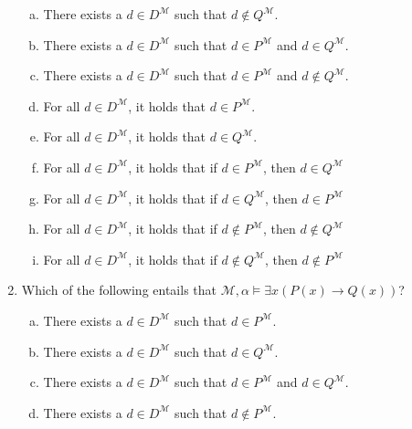 \begin{enumerate}[\thesection.1]
\begin{enumerate}[(a)]
  \item There exists a $d\in D^\mathcal{M}$ such that $d\notin
    Q^\mathcal{M}$.
  
  \item There exists a $d\in D^\mathcal{M}$ such that $d\in
    P^\mathcal{M}$ and $d\in Q^\mathcal{M}$.

  \item There exists a $d\in D^\mathcal{M}$ such that $d\in
    P^\mathcal{M}$ and $d\notin Q^\mathcal{M}$.

   \item For all $d\in D^\mathcal{M}$, it holds that  $d\in
  P^\mathcal{M}$.

   \item For all $d\in D^\mathcal{M}$, it holds that  $d\in
  Q^\mathcal{M}$.
    
  \item For all $d\in D^\mathcal{M}$, it holds that if $d\in
    P^\mathcal{M}$, then $d\in Q^\mathcal{M}$

  \item For all $d\in D^\mathcal{M}$, it holds that if $d\in
    Q^\mathcal{M}$, then $d\in P^\mathcal{M}$
    
  \item For all $d\in D^\mathcal{M}$, it holds that if $d\notin
    P^\mathcal{M}$, then $d\notin Q^\mathcal{M}$

  \item For all $d\in D^\mathcal{M}$, it holds that if $d\notin
    Q^\mathcal{M}$, then $d\notin P^\mathcal{M}$
    
  \end{enumerate}

\item Which of the following entails that $\mathcal{M},\alpha\vDash
  \exists x (P(x)\to Q(x))$?

\begin{enumerate}[(a)]

\item There exists a $d\in D^\mathcal{M}$ such that $d\in
  P^\mathcal{M}$.

  \item There exists a $d\in D^\mathcal{M}$ such that $d\in Q^\mathcal{M}$.
  
\item There exists a $d\in D^\mathcal{M}$ such that $d\in
  P^\mathcal{M}$ and $d\in Q^\mathcal{M}$.

\item There exists a $d\in D^\mathcal{M}$ such that $d\notin
  P^\mathcal{M}$.


\end{enumerate}
\end{enumerate}
